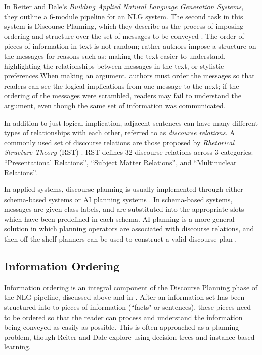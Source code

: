 \documentclass[12pt]{article}
\begin{document}
In Reiter and Dale's {\em Building Applied Natural Language Generation Systems}, they outline a 6-module pipeline for an NLG system. The second task in this system is Discourse Planning, which they describe as the process of imposing ordering and structure over the set of messages to be conveyed \cite{applied_nlg}. The order of pieces of information in text is not random; rather authors impose a structure on the messages for reasons such as: making the text easier to understand, highlighting the relationships between messages in the text, or stylistic preferences.When making an argument, authors must order the messages so that readers can see the logical implications from one message to the next; if the ordering of the messages were scrambled, readers may fail to understand the argument, even though the same set of information was communicated.

In addition to just logical implication, adjacent sentences can have many different types of relationships with each other, referred to as {\em discourse relations}. A commonly used set of discourse relations are those proposed by {\em Rhetorical Structure Theory} (RST) \cite{rst}. RST defines 32 discourse relations across 3 categories: ``Presentational Relations'', ``Subject Matter Relations'', and ``Multinuclear Relations''.

In applied systems, discourse planning is usually implemented through either schema-based systems or AI planning systems \cite{applied_nlg}. In schema-based systems, messages are given class labels, and are substituted into the appropriate slots which have been predefined in each schema. AI planning is a more general solution in which planning operators are associated with discourse relations, and then off-the-shelf planners can be used to construct a valid discourse plan \cite{hovy1993automated}\cite{paris1990natural}.

\subsection{Information Ordering}

Information ordering is an integral component of the Discourse Planning phase
of the NLG pipeline, discussed above and in \cite{applied_nlg}. After an
information set has been structured into to pieces of information (``facts" or
sentences), these pieces need to be ordered so that the reader can process and
understand the information being conveyed as easily as possible. This is often
approached as a planning problem, though Reiter and Dale explore using decision
trees and instance-based learning.
\end{document}
